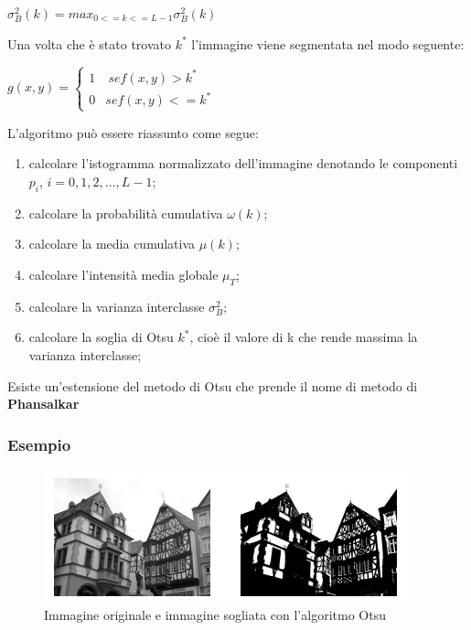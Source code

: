 \begin{center}
    $\sigma^2_B(k) = max_{0<=k<=L-1} \sigma^2_B(k)$
\end{center}

Una volta che è stato trovato $k^*$ l'immagine viene segmentata nel modo seguente:

\begin{center}
    $
        g(x,y) = \left\{ \begin{array}{cl}
            1 & \ se f(x,y) > k^* \\
            0 & se f(x,y) <= k^*
        \end{array} \right.
    $
\end{center}

L'algoritmo può essere riassunto come segue:

\begin{enumerate}
    \item calcolare l'istogramma normalizzato dell'immagine denotando le componenti $p_i$, $i=0,1,2,...,L-1$;
    \item calcolare la probabilità cumulativa $\omega(k)$;
    \item calcolare la media cumulativa $\mu(k)$;
    \item calcolare l'intensità media globale $\mu_T$;
    \item calcolare la varianza interclasse $\sigma^2_B$;
    \item  calcolare la soglia di Otsu $k^*$, cioè il valore di k che rende massima la varianza interclasse;
\end{enumerate}

Esiste un'estensione del metodo di Otsu che prende il nome di metodo di \textbf{Phansalkar}

\subsubsection*{Esempio}

\begin{figure}[H]
    \centering
    \includegraphics[width=\linewidth, keepaspectratio]{capitoli/immagini/imgs/otsu.png}
    \caption*{ Immagine originale e immagine sogliata con l'algoritmo Otsu}
\end{figure}

